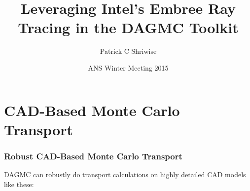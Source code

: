 \documentclass[12pt]{beamer}
\title{Leveraging Intel's Embree Ray Tracing in the DAGMC Toolkit}
\author{Patrick C Shriwise}
\institute{University of Wisconsin - Madison}
\date{ANS Winter Meeting 2015}
\begin{document}
\frame{\titlepage \addtocounter{framenumber}{-1}}


\begin{frame}
\frametitle{\null}
\tableofcontents
\end{frame}

\section{CAD-Based Monte Carlo Transport} %
\begin{frame}

\frametitle{Robust CAD-Based Monte Carlo Transport}

DAGMC can robustly do transport calculations on highly detailed CAD models like these:


\begin{center}
\begin{tabular}{c c}


\end{tabular}
\end{center}
\end{frame}
\end{document}
